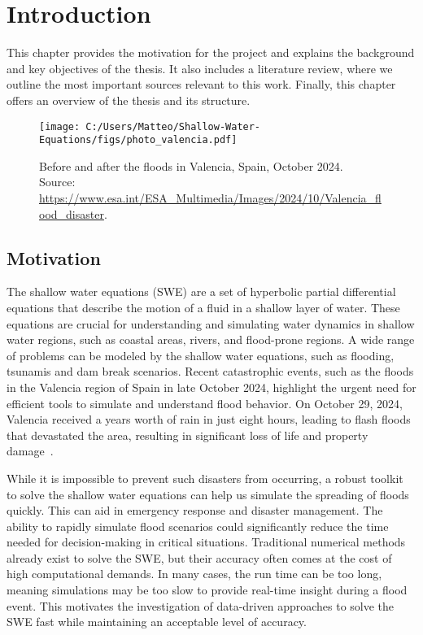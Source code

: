 \chapter{Introduction}
This chapter provides the motivation for the project and explains the background and key objectives of the thesis.
It also includes a literature review, where we outline the most important sources relevant to this work.
Finally, this chapter offers an overview of the thesis and its structure.

\begin{figure}[H]
    \centering
    \texttt{[image: C:/Users/Matteo/Shallow-Water-Equations/figs/photo\_valencia.pdf]}
    \caption{Before and after the floods in Valencia, Spain, October 2024.\\
            Source: \url{https://www.esa.int/ESA_Multimedia/Images/2024/10/Valencia_flood_disaster}.}
\end{figure}

\section{Motivation}
The shallow water equations (SWE) are a set of hyperbolic partial differential equations that describe the motion of a fluid in a shallow layer of water.
These equations are crucial for understanding and simulating water dynamics in shallow water regions, such as coastal areas, rivers, and flood-prone regions.
A wide range of problems can be modeled by the shallow water equations, such as flooding, tsunamis and dam break scenarios.
Recent catastrophic events, such as the floods in the Valencia region of Spain in late October 2024, highlight the urgent need for efficient tools to simulate and understand flood behavior.
On October 29, 2024, Valencia received a years worth of rain in just eight hours, leading to flash floods that devastated the area, resulting in significant loss of life and property damage~\cite{valencia_flood_disaster_esa}.

While it is impossible to prevent such disasters from occurring, a robust toolkit to solve the shallow water equations can help us simulate the spreading of floods quickly.
This can aid in emergency response and disaster management.
The ability to rapidly simulate flood scenarios could significantly reduce the time needed for decision-making in critical situations.
Traditional numerical methods already exist to solve the SWE, but their accuracy often comes at the cost of high computational demands.
In many cases, the run time can be too long, meaning simulations may be too slow to provide real-time insight during a flood event.
This motivates the investigation of data-driven approaches to solve the SWE fast while maintaining an acceptable level of accuracy.


